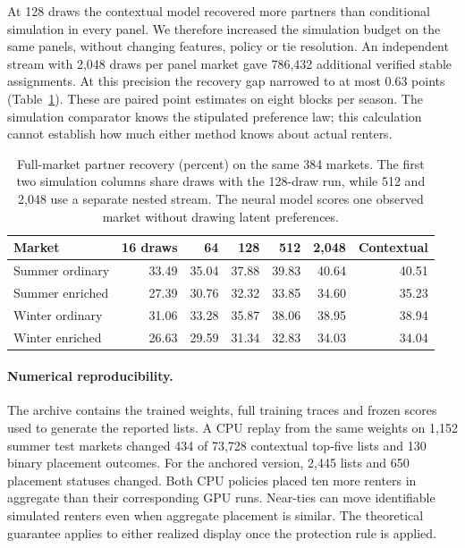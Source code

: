At 128 draws the contextual model recovered more partners than conditional simulation in every panel. We therefore increased the simulation budget on the same panels, without changing features, policy or tie resolution. An independent stream with 2,048 draws per panel market gave 786,432 additional verified stable assignments. At this precision the recovery gap narrowed to at most 0.63 points (Table~\ref{tab:mc}). These are paired point estimates on eight blocks per season. The simulation comparator knows the stipulated preference law; this calculation cannot establish how much either method knows about actual renters.
\begin{table}[ht]\centering\small
\caption{Full-market partner recovery (percent) on the same 384 markets. The first two simulation columns share draws with the 128-draw run, while 512 and 2,048 use a separate nested stream. The neural model scores one observed market without drawing latent preferences.}
\label{tab:mc}
\begin{tabular}{@{}lrrrrrr@{}}\toprule
Market & 16 draws & 64 & 128 & 512 & 2,048 & Contextual\\\midrule
Summer ordinary & 33.49 & 35.04 & 37.88 & 39.83 & 40.64 & 40.51\\
Summer enriched & 27.39 & 30.76 & 32.32 & 33.85 & 34.60 & 35.23\\
Winter ordinary & 31.06 & 33.28 & 35.87 & 38.06 & 38.95 & 38.94\\
Winter enriched & 26.63 & 29.59 & 31.34 & 32.83 & 34.03 & 34.04\\\bottomrule
\end{tabular}\end{table}

\paragraph{Numerical reproducibility.}
The archive contains the trained weights, full training traces and frozen scores used to generate the reported lists. A CPU replay from the same weights on 1,152 summer test markets changed 434 of 73,728 contextual top-five lists and 130 binary placement outcomes. For the anchored version, 2,445 lists and 650 placement statuses changed. Both CPU policies placed ten more renters in aggregate than their corresponding GPU runs. Near-ties can move identifiable simulated renters even when aggregate placement is similar. The theoretical guarantee applies to either realized display once the protection rule is applied.
